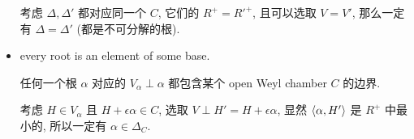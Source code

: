 \begin{itemize}
\begin{tcolorbox}[title=proof:]
		考虑 $\Delta, \Delta'$ 都对应同一个 $C$, 它们的 $R^+ = R'^+$, 且可以选取 $V = V'$, 那么一定有 $\Delta = \Delta'$ (都是不可分解的根).
	\end{tcolorbox}
	
	\item every root is an element of some base.
	
	\begin{tcolorbox}[title=proof:]
		任何一个根 $\alpha$ 对应的 $V_\alpha \perp \alpha$ 都包含某个 open Weyl chamber $C$ 的边界.
		
		考虑 $H \in V_\alpha$ 且 $H + \epsilon \alpha \in C$, 选取 $V \perp H' = H + \epsilon \alpha$, 显然 $\braket{\alpha, H'}$ 是 $R^+$ 中最小的, 所以一定有 $\alpha \in \Delta_C$.
	\end{tcolorbox}
\end{itemize}

